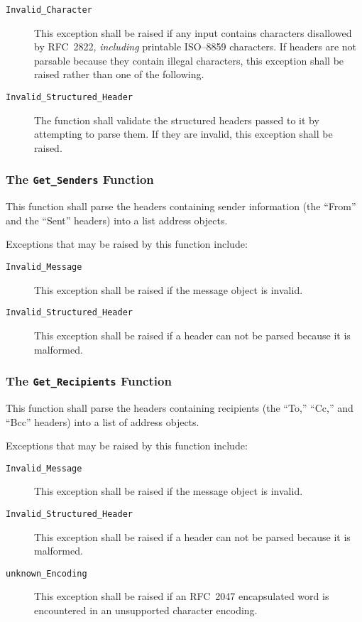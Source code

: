 \documentclass[11pt]{article}
\begin{document}
\begin{description}

\item[\texttt{Invalid\_Character}] This exception shall be raised if
  any input contains characters disallowed by RFC~2822,
  \emph{including} printable ISO--8859 characters. If headers are not
  parsable because they contain illegal characters, this exception
  shall be raised rather than one of the following.

\item[\texttt{Invalid\_Structured\_Header}] The function shall
  validate the structured headers passed to it by attempting to parse
  them. If they are invalid, this exception shall be raised.

\end{description}

\subsubsection{The \texttt{Get\_Senders} Function}

This function shall parse the headers containing sender information
(the ``From'' and the ``Sent'' headers) into a list address objects.

Exceptions that may be raised by this function include: 

\begin{description}

\item[\texttt{Invalid\_Message}] This exception shall be raised if the
  message object is invalid.

\item[\texttt{Invalid\_Structured\_Header}] This exception shall be
  raised if a header can not be parsed because it is malformed.

\end{description}

\subsubsection{The \texttt{Get\_Recipients} Function}

This function shall parse the headers containing recipients (the
``To,'' ``Cc,'' and ``Bcc'' headers) into a list of address objects.

Exceptions that may be raised by this function include: 

\begin{description}

\item[\texttt{Invalid\_Message}] This exception shall be raised if the
  message object is invalid.

\item[\texttt{Invalid\_Structured\_Header}] This exception shall be
  raised if a header can not be parsed because it is malformed.

\item[\texttt{unknown\_Encoding}] This exception shall be raised if
  an RFC~2047 encapsulated word is encountered in an unsupported
  character encoding.

\end{description}
\end{document}
